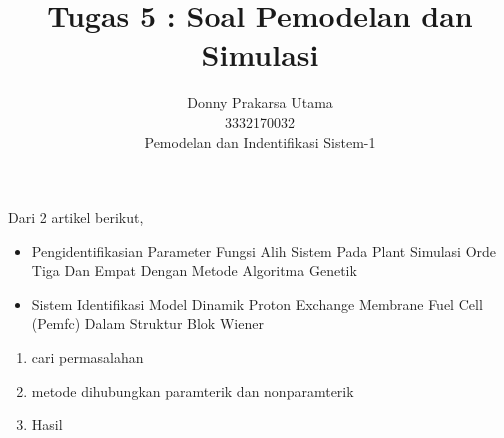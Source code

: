 \documentclass[10pt]{article}
\begin{document}
\title{Tugas 5 : Soal Pemodelan dan Simulasi }
\author{Donny Prakarsa Utama\\3332170032\\Pemodelan dan Indentifikasi Sistem-1}
\maketitle

Dari 2 artikel berikut,
\begin{itemize}
\item Pengidentifikasian Parameter Fungsi Alih Sistem Pada Plant Simulasi Orde Tiga Dan Empat Dengan Metode Algoritma Genetik
\item Sistem Identifikasi Model Dinamik Proton Exchange Membrane Fuel Cell (Pemfc) Dalam Struktur Blok Wiener
\end{itemize}
\begin{enumerate}
\item cari permasalahan
\item metode dihubungkan paramterik dan nonparamterik
\item Hasil
\end{enumerate}
\end{document}
